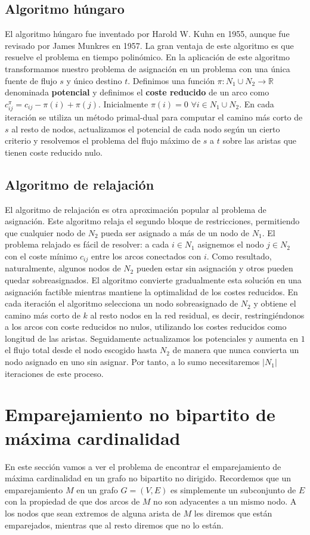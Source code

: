 \documentclass[twoside,12pt]{article}
\begin{document}
\subsection{Algoritmo húngaro}
El algoritmo húngaro fue inventado por Harold W. Kuhn en 1955, aunque fue revisado por James Munkres en 1957. La gran ventaja de este algoritmo es que resuelve el problema en tiempo polinómico. En la aplicación de este algoritmo transformamos nuestro problema de asignación en un problema con una única fuente de flujo $s$ y único destino $t$. Definimos una función $\pi : N_1\cup N_2 \to \mathbb{R}$ denominada \textbf{potencial} y definimos el \textbf{coste reducido} de un arco como $c_{ij}^\pi = c_{ij}-\pi(i)+\pi(j)$. Inicialmente $\pi(i) = 0$ $\forall i \in N_1\cup N_2$. En cada iteración se utiliza un método primal-dual para computar el camino más corto de $s$ al resto de nodos, actualizamos el potencial de cada nodo según un cierto criterio y resolvemos el problema del flujo máximo de $s$ a $t$ sobre las aristas que tienen coste reducido nulo. 

\subsection{Algoritmo de relajación}
El algoritmo de relajación es otra aproximación popular al problema de asignación. Este algoritmo relaja el segundo bloque de restricciones, permitiendo que cualquier nodo de $N_2$ pueda ser asignado a más de un nodo de $N_1$. El problema relajado es fácil de resolver: a cada $i\in N_1$ asignemos el nodo $j\in N_2$ con el coste mínimo $c_{ij}$ entre los arcos conectados con $i$. Como resultado, naturalmente, algunos nodos de $N_2$ pueden estar sin asignación y otros pueden quedar sobreasignados. El algoritmo convierte gradualmente esta solución en una asignación factible mientras mantiene la optimalidad de los costes reducidos. En cada iteración el algoritmo selecciona un nodo sobreasignado de $N_2$ y obtiene el camino más corto de $k$ al resto nodos en la red residual, es decir, restringiéndonos a los arcos con coste reducidos no nulos, utilizando los costes reducidos como longitud de las aristas. Seguidamente actualizamos los potenciales y aumenta en $1$ el flujo total desde el nodo escogido hasta $N_2$ de manera que nunca convierta un nodo asignado en uno sin asignar. Por tanto, a lo sumo necesitaremos $|N_1|$ iteraciones de este proceso.

\section{Emparejamiento no bipartito de máxima cardinalidad}
En este sección vamos a ver el problema de encontrar el emparejamiento de máxima cardinalidad en un grafo no bipartito no dirigido. Recordemos que un emparejamiento $M$ en un grafo $G=(V,E)$ es simplemente un subconjunto de $E$ con la propiedad de que dos arcos de $M$ no son adyacentes a un mismo nodo. A los nodos que sean extremos de alguna arista de $M$ les diremos que están emparejados, mientras que al resto diremos que no lo están. 
\end{document}
